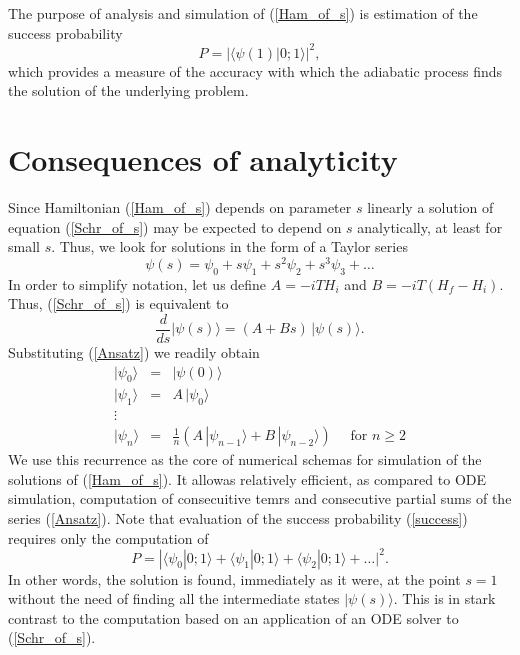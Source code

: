 \documentclass[11 pt]{article}
\begin{document}
The purpose of analysis and simulation of (\ref{Ham_of_s}) is estimation of the success probability
\begin{equation}\label{success}
P = |\langle \psi(1)| 0;1\rangle |^2,
\end{equation}
which provides a measure of the accuracy with which the adiabatic process finds the solution of the underlying problem. 

\section{Consequences of analyticity}

Since Hamiltonian (\ref{Ham_of_s}) depends on parameter $s$ linearly a solution of equation (\ref{Schr_of_s}) may be expected to depend on $s$ analytically, at least for small $s$. Thus, we look for solutions in the form of a Taylor series
\begin{equation}\label{Ansatz}
\psi(s) = \psi_0 +s\psi_1 +s^2\psi_2 + s^3\psi_3+\ldots
\end{equation}
In order to simplify notation, let us define $A = -iTH_i$ and $B=-iT(H_f-H_i)$. Thus, (\ref{Schr_of_s}) is equivalent to
\begin{equation}\label{Schr_AB}
\frac{d}{ds} |\psi(s)\rangle= (A+Bs)\,|\psi(s)\rangle.
\end{equation}
Substituting (\ref{Ansatz}) we readily obtain
\begin{equation}\label{recurrence}
\begin{array}{lll}
|\psi_0\rangle &=& |\psi(0)\rangle \\
|\psi_1\rangle & =& A \,|\psi_0\rangle \\
\vdots & &\\
|\psi_n\rangle & = &\frac{1}{n} \left(A\, |\psi_{n-1}\rangle + B\, |\psi_{n-2}\rangle\right)\quad \mbox{ for } n\geq 2
\end{array}
\end{equation}
We use this recurrence as the core of numerical schemas for simulation of the solutions of (\ref{Ham_of_s}). It allowas relatively efficient, as compared to ODE simulation, computation of consecuitive temrs and consecutive partial sums of the series (\ref{Ansatz}). Note that evaluation of the success probability (\ref{success}) requires only the computation of 
\[
P =  |\langle\psi_0 | 0;1\rangle +\langle \psi_1| 0;1\rangle +\langle \psi_2 | 0;1\rangle+\ldots |^2.
\]
In other words, the solution is found, immediately as it were, at the point $s=1$ without the need of finding all the intermediate states $|\psi(s)\rangle$. This is in stark contrast to the computation based on an application of an ODE solver to (\ref{Schr_of_s}).
\end{document}
